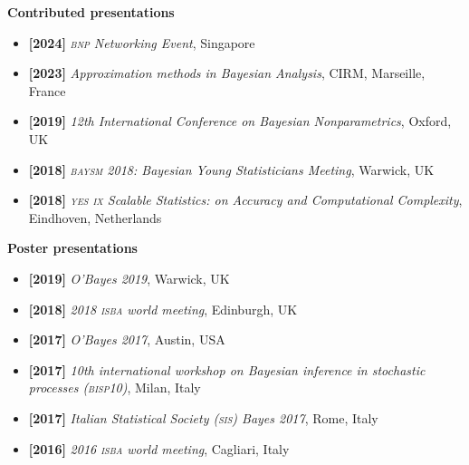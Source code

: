 \documentclass[10pt]{article}
\newenvironment{outerlist}[1][\enskip\tiny\textbullet]%
        {\begin{itemize}[#1]}{\end{itemize}%
         \vspace{-.6\baselineskip}}
\newcommand{\blankline}{\quad\pagebreak[2]}
\begin{document}
\textbf{Contributed presentations}
\begin{outerlist}
\item[\textbf{[2024]}] \textsl{\textsc{bnp} Networking Event}, Singapore

\item[\textbf{[2023]}] \textsl{Approximation methods in Bayesian Analysis}, CIRM, Marseille, France
\item[\textbf{[2019]}] \textsl{12th International Conference on Bayesian Nonparametrics}, Oxford, UK
\item[\textbf{[2018]}] \textsl{\textsc{baysm} 2018: Bayesian Young Statisticians Meeting}, Warwick, UK
\item[\textbf{[2018]}] \textsl{\textsc{yes ix} Scalable Statistics: on Accuracy and Computational Complexity}, Eindhoven, Netherlands
\end{outerlist}

\blankline

\textbf{Poster presentations}
\begin{outerlist}
\item[\textbf{[2019]}] \textsl{O'Bayes 2019}, Warwick, UK
\item[\textbf{[2018]}] \textsl{2018 \textsc{isba} world meeting}, Edinburgh, UK 
\item[\textbf{[2017]}] \textsl{O'Bayes 2017}, Austin, USA
\item[\textbf{[2017]}]  \textsl{10th international workshop on Bayesian inference in stochastic processes (\textsc{bisp10})}, Milan, Italy
\item[\textbf{[2017]}] \textsl{Italian Statistical Society (\textsc{sis}) Bayes 2017}, Rome, Italy
\item[\textbf{[2016]}] \textsl{2016 \textsc{isba} world meeting}, Cagliari, Italy
\end{outerlist}
\end{document}
